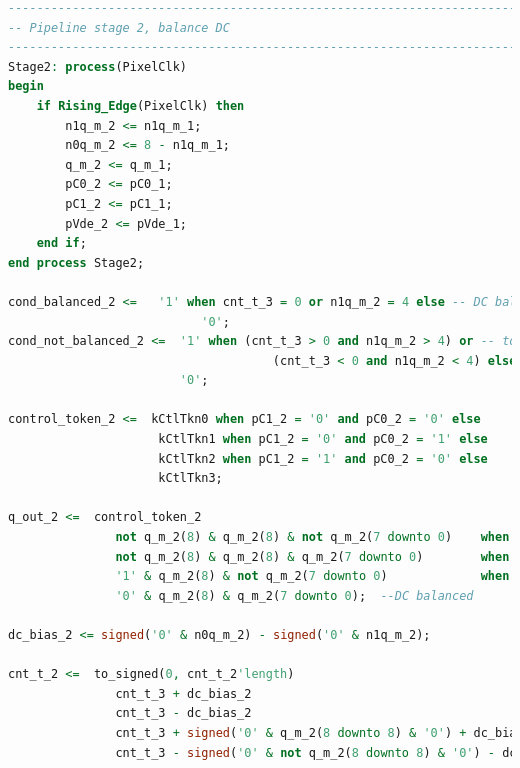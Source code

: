 \begin{lstlisting}[caption={TMDS encoder DC balancing stage.}, label={lst:encoder_stage_2}, language=VHDL]
--------------------------------------------------------------------------
-- Pipeline stage 2, balance DC
--------------------------------------------------------------------------
Stage2: process(PixelClk)
begin
    if Rising_Edge(PixelClk) then
        n1q_m_2 <= n1q_m_1;
        n0q_m_2 <= 8 - n1q_m_1;
        q_m_2 <= q_m_1;
        pC0_2 <= pC0_1;
        pC1_2 <= pC1_1;
        pVde_2 <= pVde_1;
    end if;
end process Stage2;

cond_balanced_2 <=   '1' when cnt_t_3 = 0 or n1q_m_2 = 4 else -- DC balanced output
                           '0';
cond_not_balanced_2 <=  '1' when (cnt_t_3 > 0 and n1q_m_2 > 4) or -- too many 1's
                                     (cnt_t_3 < 0 and n1q_m_2 < 4) else -- too many 0's
                        '0';

control_token_2 <=  kCtlTkn0 when pC1_2 = '0' and pC0_2 = '0' else
                     kCtlTkn1 when pC1_2 = '0' and pC0_2 = '1' else
                     kCtlTkn2 when pC1_2 = '1' and pC0_2 = '0' else
                     kCtlTkn3;
                            
q_out_2 <=  control_token_2                                             when pVde_2 = '0' else  --control period
               not q_m_2(8) & q_m_2(8) & not q_m_2(7 downto 0)    when cond_balanced_2 = '1' and q_m_2(8) = '0' else
               not q_m_2(8) & q_m_2(8) & q_m_2(7 downto 0)        when cond_balanced_2 = '1' and q_m_2(8) = '1' else
               '1' & q_m_2(8) & not q_m_2(7 downto 0)             when cond_not_balanced_2 = '1' else
               '0' & q_m_2(8) & q_m_2(7 downto 0);  --DC balanced

dc_bias_2 <= signed('0' & n0q_m_2) - signed('0' & n1q_m_2);

cnt_t_2 <=  to_signed(0, cnt_t_2'length)                                   when pVde_2 = '0' else   --control period
               cnt_t_3 + dc_bias_2                                            when cond_balanced_2 = '1' and q_m_2(8) = '0' else
               cnt_t_3 - dc_bias_2                                            when cond_balanced_2 = '1' and q_m_2(8) = '1' else
               cnt_t_3 + signed('0' & q_m_2(8 downto 8) & '0') + dc_bias_2     when cond_not_balanced_2 = '1' else
               cnt_t_3 - signed('0' & not q_m_2(8 downto 8) & '0') - dc_bias_2;
\end{lstlisting}

